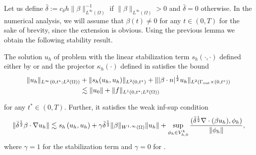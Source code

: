 Let us define $\bar{\delta} := c_{\delta} {h}{\| \beta \|_{L^\infty(\Omega)}^{-1}}$ if $\| \beta \|_{L^\infty(\Omega)}>0$ and $\bar{\delta} = 0$ otherwise. In the numerical analysis, we will assume that $\beta(t) \not = 0$ for any $t \in (0,T)$ for the sake of brevity, since the extension is obvious. Using the previous lemma we obtain the following stability result.
\begin{theorem}[Stability]
The solution $u_h$ of problem  with the linear stabilization term $s_h(\cdot,\cdot)$ defined either by  or  and the projector $\kappa_h(\cdot)$ defined in  
satisfies the bound
\begin{align*}
\| u_h\|_{L^\infty(0,t^*;L^2(\Omega))} &+ \|s_h(u_h,u_h)\|_{L^2(0,t^*)} + \| |\beta \cdot n|^{\frac{1}{2}} u_h\|_{L^2( \Gamma_{\rm out} \times (0,t^*))} \\
 & \lesssim \|u_0\| + \|f\|_{L^1(0,t^*;L^2(\Omega))}
\end{align*}

for any $t^* \in (0,T)$. Further, it satisfies the weak inf-sup condition
\begin{align}\label{eq-dinfsup}
\| \bar{\delta}^{\frac{1}{2}} \beta \cdot \nabla u_h \| \lesssim   s_h\left(u_h,u_h\right)  +
\gamma \bar\delta^{\frac{1}{2}} \|\beta\|_{W^{1,\infty}(\Omega)}  \|u_h\| + \sup_{\phi_h \in V^k_{h,0}} \frac{(\bar\delta^{\frac{1}{2}} \nabla \cdot (\beta u_h),\phi_h)}{\|\phi_h\|},
\end{align}
where $\gamma = 1$ for the stabilization term  and $\gamma = 0$ for .
\end{theorem}

